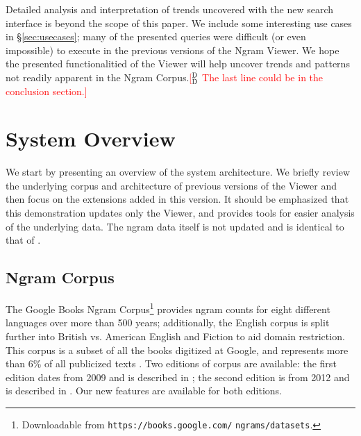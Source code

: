 \documentclass[11pt,a4paper]{article}
\newcommand{\ddcomment}[1]{\textcolor{red}{[$^{\textsc{D}}_{\textsc{D}}$ #1]}}
\begin{document}
Detailed analysis and interpretation of trends uncovered with the new search interface is beyond the scope of this paper. We include some interesting use cases in \S\ref{sec:usecases}; many of the presented queries were difficult (or even impossible) to execute in the previous versions of the Ngram Viewer. We hope the presented functionalitied of the Viewer will help uncover trends and patterns not readily apparent in the Ngram Corpus.\ddcomment{The last line could be in the conclusion section.}

\section{System Overview}
\label{sec:overview}

We start by presenting an overview of the system architecture. We briefly review the underlying corpus and architecture of previous versions of the Viewer \cite{culturomics,lin2012syntactic} and then focus on the extensions added in this version. It should be emphasized that this demonstration updates only the Viewer, and provides tools for easier analysis of the underlying data. The ngram data itself is not updated and is identical to that of .


\subsection{Ngram Corpus}
	The Google Books Ngram Corpus\footnote{Downloadable from \texttt{https://books.google.com/} \texttt{ngrams/datasets}.} provides ngram counts for eight different languages over more than 500 years; additionally, the English corpus is split further into British vs. American English and Fiction to aid domain restriction. This corpus is a subset of all the books digitized at Google, and represents more than 6\% of all publicized texts \cite{lin2012syntactic}. Two editions of corpus are available: the first edition dates from 2009 and is described in ; the second edition is from 2012 and is described in . Our new features are available for both editions.
\end{document}
